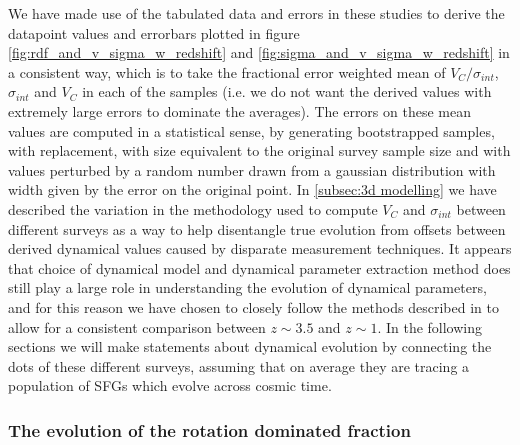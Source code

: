 \documentclass[fleqn,usenatbib]{mn2e}
\begin{document}
We have made use of the tabulated data and errors in these studies to derive the datapoint values and errorbars plotted in figure \ref{fig:rdf_and_v_sigma_w_redshift} and \ref{fig:sigma_and_v_sigma_w_redshift} in a consistent way, which is to take the fractional error weighted mean of $V_{C}/\sigma_{int}$, $\sigma_{int}$ and $V_{C}$ in each of the samples (i.e. we do not want the derived values with extremely large errors to dominate the averages).
The errors on these mean values are computed in a statistical sense, by generating bootstrapped samples, with replacement, with size equivalent to the original survey sample size and with values perturbed by a random number drawn from a gaussian distribution with width given by the error on the original point.
In \cref{subsec:3d modelling} we have described the variation in the methodology used to compute $V_{C}$ and $\sigma_{int}$ between different surveys as a way to help disentangle true evolution from offsets between derived dynamical values caused by disparate measurement techniques.
It appears that choice of dynamical model and dynamical parameter extraction method does still play a large role in understanding the evolution of dynamical parameters, and for this reason we have chosen to closely follow the methods described in \cite{Harrison2017} to allow for a consistent comparison between $z \sim 3.5$ and $z \sim 1$. 
In the following sections we will make statements about dynamical evolution by connecting the dots of these different surveys, assuming that on average they are tracing a population of SFGs which evolve across cosmic time. 

\subsubsection{The evolution of the rotation dominated fraction}\label{subsubsec:RDF_evolution}
\end{document}
